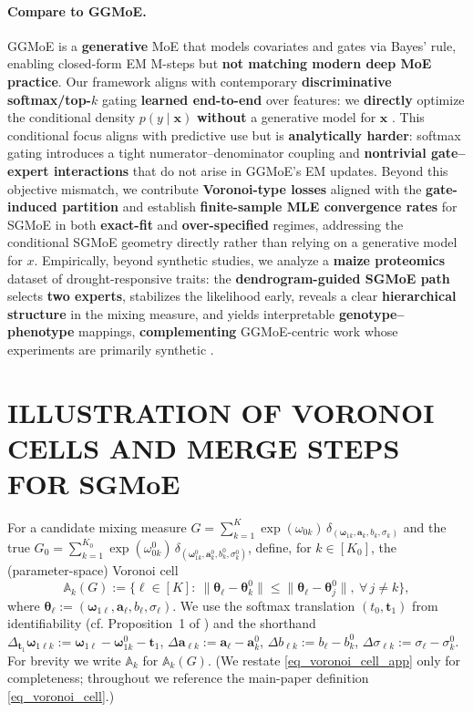\documentclass[twoside]{article}
\theoremstyle{plain}
\theoremstyle{definition}
\theoremstyle{plain}
\def\vtheta{{\bm{\theta}}}
\def\vomega{{\bm{\omega}}}
\def\va{{\bm{a}}}
\def\vt{{\bm{t}}}
\def\vx{{\bm{x}}}
\def\sA{{\mathbb{A}}}
\begin{document}
\paragraph{Compare to GGMoE.}
GGMoE is a \textbf{generative} MoE that models covariates and gates via Bayes’ rule, enabling closed-form EM M-steps but \textbf{not matching modern deep MoE practice}. Our framework aligns with contemporary \textbf{discriminative softmax/top-$k$} gating \textbf{learned end-to-end} over features: we \textbf{directly} optimize the conditional density $p(y \mid \vx)$ \textbf{without} a generative model for $\vx$ \citep{dai-etal-2024-deepseekmoe,nguyen2024statisticalperspectivetopksparse,Shazeer_JMLR,pham_competesmoeeffective_2024,do_hyperrouter_2023}. This conditional focus aligns with predictive use but is \textbf{analytically harder}: softmax gating introduces a tight numerator–denominator coupling and \textbf{nontrivial gate–expert interactions} that do not arise in GGMoE’s EM updates. Beyond this objective mismatch, we contribute \textbf{Voronoi-type losses} aligned with the \textbf{gate-induced partition} and establish \textbf{finite-sample MLE convergence rates} for SGMoE in both \textbf{exact-fit} and \textbf{over-specified} regimes, addressing the conditional SGMoE geometry directly rather than relying on a generative model for $x$. Empirically, beyond synthetic studies, we analyze a \textbf{maize proteomics} dataset of drought-responsive traits: the \textbf{dendrogram-guided SGMoE path} selects \textbf{two experts}, stabilizes the likelihood early, reveals a clear \textbf{hierarchical structure} in the mixing measure, and yields interpretable \textbf{genotype–phenotype} mappings, \textbf{complementing} GGMoE-centric work whose experiments are primarily synthetic \citep{thai_model_2025}.

\section{ILLUSTRATION OF VORONOI CELLS AND MERGE STEPS FOR SGMoE}\label{appendix_Voronoi}

For a candidate mixing measure
\(G=\sum_{k=1}^{K}\exp(\omega_{0k})\,\delta_{(\vomega_{1k},\va_k,b_k,\sigma_k)}\)
and the true
\(G_0=\sum_{k=1}^{K_0}\exp(\omega^0_{0k})\,\delta_{(\vomega^0_{1k},\va^0_k,b^0_k,\sigma^0_k)}\),
define, for \(k\in[K_0]\), the (parameter-space) Voronoi cell
\begin{equation}
\sA_k(G):=\big\{\ell\in[K]:\ \|\vtheta_\ell-\vtheta^0_k\|
\le \|\vtheta_\ell-\vtheta^0_j\|,\ \forall\, j\neq k\big\},
\label{eq_voronoi_cell_app}
\end{equation}
where \(\vtheta_\ell:=(\vomega_{1\ell},\va_\ell,b_\ell,\sigma_\ell)\).
We use the softmax translation \((t_0,\vt_1)\) from identifiability
(cf. Proposition~1 of \citealp{nguyen_demystifying_2023}) and the shorthand
\(\Delta_{\vt_1}\vomega_{1\ell k}:=\vomega_{1\ell}-\vomega^0_{1k}-\vt_1\),
\(\Delta\va_{\ell k}:=\va_\ell-\va^0_k\),
\(\Delta b_{\ell k}:=b_\ell-b^0_k\),
\(\Delta\sigma_{\ell k}:=\sigma_\ell-\sigma^0_k\).
For brevity we write \(\sA_k\) for \(\sA_k(G)\).
(We restate \cref{eq_voronoi_cell_app} only for completeness; throughout we reference the main-paper definition \cref{eq_voronoi_cell}.)
\end{document}
